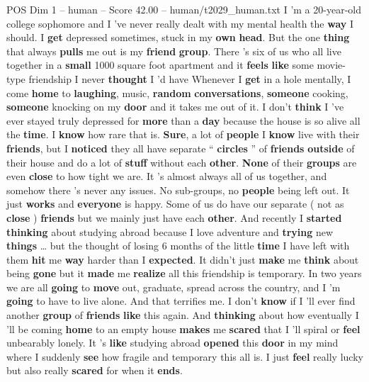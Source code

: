 \begin{textsample}{POS Dim 1 – human – Score 42.00 – human/t2029\_human.txt}  \label{ex:f1_pos_039}
I ’m a 20-year-old college sophomore and I ’ve never really dealt with my mental health the \textbf{way} I should.
I \textbf{get} depressed sometimes, stuck in my \textbf{own} \textbf{head}.
But the one \textbf{thing} that always \textbf{pulls} me out is my \textbf{friend} \textbf{group}.
There ’s six of us who all live together in a \textbf{small} 1000 square foot apartment and it \textbf{feels} \textbf{like} some movie-type friendship I never \textbf{thought} I ’d have Whenever I \textbf{get} in a hole mentally, I come \textbf{home} to \textbf{laughing}, music, \textbf{random} \textbf{conversations}, \textbf{someone} cooking, \textbf{someone} knocking on my \textbf{door} and it takes me out of it.
I don't \textbf{think} I ’ve ever stayed truly depressed for \textbf{more} than a \textbf{day} because the house is so alive all the \textbf{time}.
I \textbf{know} how rare that is. \textbf{Sure}, a lot of \textbf{people} I \textbf{know} live with their \textbf{friends}, but I \textbf{noticed} they all have separate “ \textbf{circles} ” of \textbf{friends} \textbf{outside} of their house and do a lot of \textbf{stuff} without each \textbf{other}. \textbf{None} of their \textbf{groups} are even \textbf{close} to how tight we are.
It ’s almost always all of us together, and somehow there ’s never any issues.
No sub-groups, no \textbf{people} being left out.
It just \textbf{works} and \textbf{everyone} is happy.
Some of us do have our separate ( not as \textbf{close} ) \textbf{friends} but we mainly just have each \textbf{other}.
And recently I \textbf{started} \textbf{thinking} about studying abroad because I love adventure and \textbf{trying} new \textbf{things} … but the thought of losing 6 months of the little \textbf{time} I have left with them \textbf{hit} me \textbf{way} harder than I \textbf{expected}.
It didn't just \textbf{make} me \textbf{think} about being \textbf{gone} but it \textbf{made} me \textbf{realize} all this friendship is temporary.
In two years we are all \textbf{going} to \textbf{move} out, graduate, spread across the country, and I ’m \textbf{going} to have to live alone.
And that terrifies me.
I don't \textbf{know} if I ’ll ever find another \textbf{group} of \textbf{friends} \textbf{like} this again.
And \textbf{thinking} about how eventually I ’ll be coming \textbf{home} to an empty house \textbf{makes} me \textbf{scared} that I ’ll spiral or \textbf{feel} unbearably lonely.
It ’s \textbf{like} studying abroad \textbf{opened} this \textbf{door} in my mind where I suddenly \textbf{see} how fragile and temporary this all is.
I just \textbf{feel} really lucky but also really \textbf{scared} for when it \textbf{ends}.

\end{textsample}
